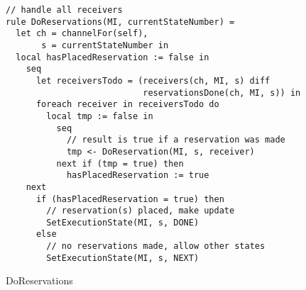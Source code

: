 \begin{listing}[H]
\begin{verbatim}
// handle all receivers
rule DoReservations(MI, currentStateNumber) =
  let ch = channelFor(self),
       s = currentStateNumber in
  local hasPlacedReservation := false in
    seq
      let receiversTodo = (receivers(ch, MI, s) diff
                           reservationsDone(ch, MI, s)) in
      foreach receiver in receiversTodo do
        local tmp := false in
          seq
            // result is true if a reservation was made
            tmp <- DoReservation(MI, s, receiver)
          next if (tmp = true) then
            hasPlacedReservation := true
    next
      if (hasPlacedReservation = true) then
        // reservation(s) placed, make update
        SetExecutionState(MI, s, DONE)
      else
        // no reservations made, allow other states
        SetExecutionState(MI, s, NEXT)
\end{verbatim}
\caption{DoReservations}
\label{lst:asm:DoReservations}
\end{listing}





